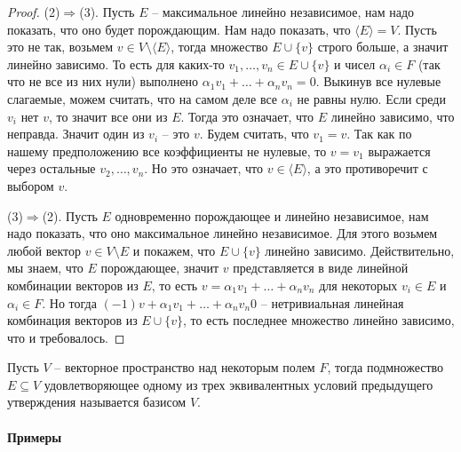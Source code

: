 \begin{proof}
(2)$\Rightarrow$(3).
Пусть $E$ -- максимальное линейно независимое, нам надо показать, что оно будет порождающим.
Нам надо показать, что $\langle E \rangle  = V$.
Пусть это не так, возьмем $v\in V\setminus \langle E \rangle$, тогда множество $E\cup \{v\}$ строго больше, а значит линейно зависимо.
То есть для каких-то $v_1,\ldots,v_n \in E\cup \{v\}$ и чисел $\alpha_i \in F$ (так что не все из них нули) выполнено $\alpha_1 v_1 + \ldots + \alpha_n v_n = 0$.
Выкинув все нулевые слагаемые, можем считать, что на самом деле все $\alpha_i$ не равны нулю.
Если среди $v_i$ нет $v$, то значит все они из $E$.
Тогда это означает, что $E$ линейно зависимо, что неправда.
Значит один из $v_i$ -- это $v$.
Будем считать, что $v_1 = v$.
Так как по нашему предположению все коэффициенты не нулевые, то $v = v_1$ выражается через остальные $v_2,\ldots,v_n$.
Но это означает, что $v\in \langle E\rangle$, а это противоречит с выбором $v$.

(3)$\Rightarrow$(2).
Пусть $E$ одновременно порождающее и линейно независимое, нам надо показать, что оно максимальное линейно независимое.
Для этого возьмем любой вектор $v\in V\setminus E$ и покажем, что $E \cup \{v\}$ линейно зависимо.
Действительно, мы знаем, что $E$ порождающее, значит $v$ представляется в виде линейной комбинации векторов из $E$, то есть $v = \alpha_1 v_1 + \ldots + \alpha_n v_n$ для некоторых $v_i\in E$ и $\alpha_i\in F$.
Но тогда $(-1)v + \alpha_1 v_1 + \ldots + \alpha_n v_n  0$ -- нетривиальная линейная комбинация векторов из $E\cup \{v\}$, то есть последнее множество линейно зависимо, что и требовалось.
\end{proof}

Пусть $V$ -- векторное пространство над некоторым полем $F$, тогда подмножество $E\subseteq V$ удовлетворяющее одному из трех эквивалентных условий предыдущего утверждения называется базисом $V$.

\paragraph{Примеры}

